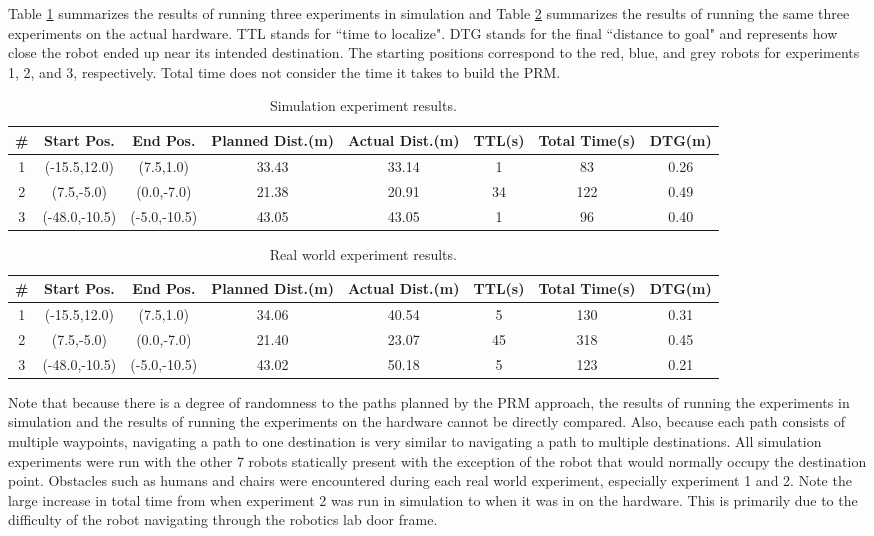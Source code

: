 \documentclass[12pt]{article}
\begin{document}
Table \ref{tab:simresults} summarizes the results of running three experiments in simulation and Table \ref{tab:realresults} summarizes the results of running the same three experiments on the actual hardware. TTL stands for ``time to localize". DTG stands for the final ``distance to goal" and represents how close the robot ended up near its intended destination. The starting positions correspond to the red, blue, and grey robots for experiments 1, 2, and 3, respectively. Total time does not consider the time it takes to build the PRM. \\

\begin{table}[h]
\footnotesize
\centering
\begin{tabular}{| c | c | c | c | c | c | c | c |}
\hline
{\#} & Start Pos. & End Pos. & Planned Dist.(m) & Actual Dist.(m) & TTL(s) & Total Time(s) & DTG(m) \\
\hline 
1 & (-15.5,12.0) & (7.5,1.0) & 33.43 & 33.14 & 1 & 83 & 0.26 \\
\hline 
2 & (7.5,-5.0) & (0.0,-7.0) & 21.38 & 20.91 & 34 & 122 & 0.49 \\
\hline 
3 & (-48.0,-10.5) & (-5.0,-10.5) & 43.05 & 43.05 & 1 & 96 & 0.40 \\
\hline
\end{tabular}
\caption{Simulation experiment results.}
\label{tab:simresults}
\end{table}

\begin{table}[h]
\footnotesize
\centering
\begin{tabular}{| c | c | c | c | c | c | c | c |}
\hline
{\#} & Start Pos. & End Pos. & Planned Dist.(m) & Actual Dist.(m) & TTL(s) & Total Time(s) & DTG(m) \\
\hline 
1 & (-15.5,12.0) & (7.5,1.0) & 34.06 & 40.54 & 5 & 130 & 0.31 \\
\hline 
2 & (7.5,-5.0) & (0.0,-7.0) & 21.40 & 23.07 & 45 & 318 & 0.45 \\
\hline 
3 & (-48.0,-10.5) & (-5.0,-10.5) & 43.02 & 50.18 & 5 & 123 & 0.21 \\
\hline

\end{tabular}
\caption{Real world experiment results.}
\label{tab:realresults}
\end{table}

Note that because there is a degree of randomness to the paths planned by the PRM approach, the results of running the experiments in simulation and the results of running the experiments on the hardware cannot be directly compared. Also, because each path consists of multiple waypoints, navigating a path to one destination is very similar to navigating a path to multiple destinations. All simulation experiments were run with the other 7 robots statically present with the exception of the robot that would normally occupy the destination point. Obstacles such as humans and chairs were encountered during each real world experiment, especially experiment 1 and 2. Note the large increase in total time from when experiment 2 was run in simulation to when it was in on the hardware. This is primarily due to the difficulty of the robot navigating through the robotics lab door frame. 
\end{document}
